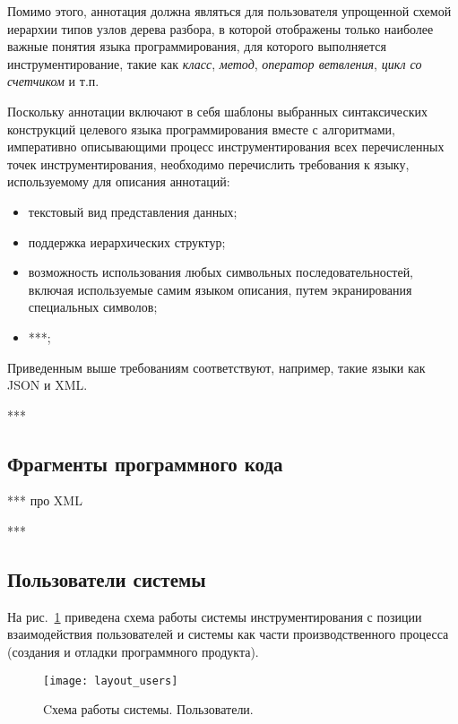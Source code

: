 Помимо этого, аннотация должна являться для пользователя упрощенной схемой иерархии типов узлов дерева разбора, в которой отображены только наиболее важные понятия языка программирования, для которого выполняется инструментирование, такие как \textit{класс}, \textit{метод}, \textit{оператор ветвления}, \textit{цикл со счетчиком} и т.п.

Поскольку аннотации включают в себя
шаблоны выбранных синтаксических конструкций целевого языка программирования вместе с 
алгоритмами, императивно описывающими процесс инструментирования всех перечисленных точек инструментирования,
необходимо перечислить требования к языку, используемому для описания аннотаций:

\begin{itemize}[noitemsep]
  \item текстовый вид представления данных;
  \item поддержка иерархических структур;
  \item возможность использования любых символьных последовательностей, включая используемые самим языком описания, путем экранирования специальных символов;
  \item ***;
\end{itemize}

Приведенным выше требованиям соответствуют, например, такие языки как JSON и XML.

***

\subsection{Фрагменты программного кода}

***
про XML

***

\subsection{Пользователи системы}

На рис.~\ref{fig:layout_users} приведена схема работы системы инструментирования с позиции взаимодействия пользователей и системы как части производственного процесса (создания и отладки программного продукта).

\begin{figure}[h]
	\centering
	\texttt{[image: layout\_users]}
	\caption{Cхема работы системы. Пользователи.}
	\label{fig:layout_users}
\end{figure}

